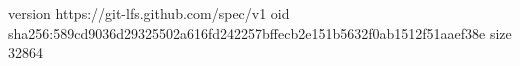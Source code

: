 version https://git-lfs.github.com/spec/v1
oid sha256:589cd9036d29325502a616fd242257bffecb2e151b5632f0ab1512f51aaef38e
size 32864
